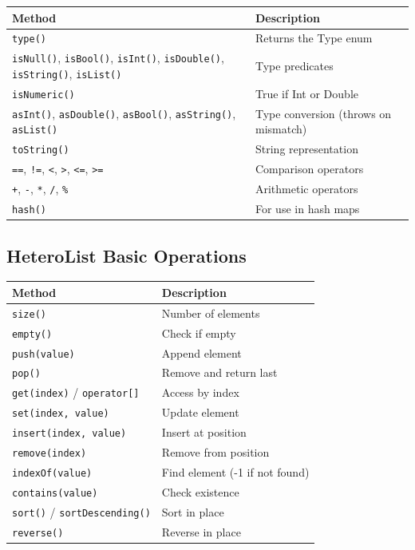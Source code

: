 \documentclass[11pt,a4paper]{article}
\begin{document}
\begin{center}
\begin{tabular}{|l|p{9cm}|}
\hline
\textbf{Method} & \textbf{Description} \\
\hline
\texttt{type()} & Returns the Type enum \\
\texttt{isNull()}, \texttt{isBool()}, \texttt{isInt()}, \texttt{isDouble()}, \texttt{isString()}, \texttt{isList()} & Type predicates \\
\texttt{isNumeric()} & True if Int or Double \\
\texttt{asInt()}, \texttt{asDouble()}, \texttt{asBool()}, \texttt{asString()}, \texttt{asList()} & Type conversion (throws on mismatch) \\
\texttt{toString()} & String representation \\
\texttt{==}, \texttt{!=}, \texttt{<}, \texttt{>}, \texttt{<=}, \texttt{>=} & Comparison operators \\
\texttt{+}, \texttt{-}, \texttt{*}, \texttt{/}, \texttt{\%} & Arithmetic operators \\
\texttt{hash()} & For use in hash maps \\
\hline
\end{tabular}
\end{center}

\subsection{HeteroList Basic Operations}

\begin{center}
\begin{tabular}{|l|p{9cm}|}
\hline
\textbf{Method} & \textbf{Description} \\
\hline
\texttt{size()} & Number of elements \\
\texttt{empty()} & Check if empty \\
\texttt{push(value)} & Append element \\
\texttt{pop()} & Remove and return last \\
\texttt{get(index)} / \texttt{operator[]} & Access by index \\
\texttt{set(index, value)} & Update element \\
\texttt{insert(index, value)} & Insert at position \\
\texttt{remove(index)} & Remove from position \\
\texttt{indexOf(value)} & Find element (-1 if not found) \\
\texttt{contains(value)} & Check existence \\
\texttt{sort()} / \texttt{sortDescending()} & Sort in place \\
\texttt{reverse()} & Reverse in place \\
\hline
\end{tabular}
\end{center}
\end{document}
